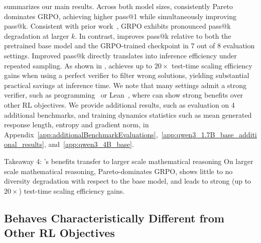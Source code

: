 \documentclass[10pt]{article} %
\begin{document}
 summarizes our main results. Across both model sizes, \ours{} consistently Pareto dominates GRPO, achieving higher pass@1 while simultaneously improving pass@k. Consistent with prior work~\citep{yue2025doesreinforcementlearningreally,wu2026invisibleleashrlvrescape}, GRPO exhibits pronounced pass@k degradation at larger $k$. In contrast, \ours{} improves pass@k relative to both the pretrained base model and the GRPO-trained checkpoint in 7 out of 8 evaluation settings. Improved pass@k directly translates into inference efficiency under repeated sampling. As shown in , \ours{} achieves up to $20\times$ test-time scaling efficiency gains when using a perfect verifier to filter wrong solutions, yielding substantial practical savings at inference time. We note that many settings admit a strong verifier, such as programming~\citep{chen2021evaluatinglargelanguagemodels} or Lean~\citep{lean_theorem_prover}, where \ours{} can show strong benefits over other RL objectives. We provide additional results, such as evaluation on 4 additional benchmarks, and training dynamics statistics such as mean generated response length, entropy and gradient norm, in Appendix~\ref{app:additionalBenchmarkEvaluations},~\ref{app:qwen3_1.7B_base_additional_results}, and~\ref{app:qwen3_4B_base}.

\begin{AIbox}{Takeaway 4: \ours{}'s benefits transfer to larger scale mathematical reasoning}
On larger scale mathematical reasoning, \ours{} Pareto-dominates GRPO, shows little to no diversity degradation with respect to the base model, and leads to strong (up to $20\times$) test-time scaling efficiency gains.
\end{AIbox}

\subsection{\ours{} Behaves Characteristically Different from Other RL Objectives}
\end{document}
